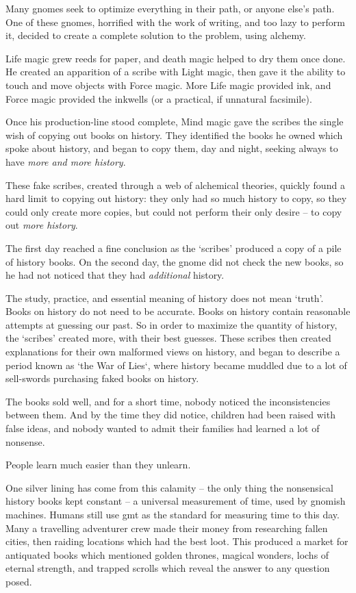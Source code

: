 \begin{multicols}{2}
\begin{exampletext}
  Many gnomes seek to optimize everything in their path, or anyone else's path.
  One of these gnomes, horrified with the work of writing, and too lazy to perform it, decided to create a complete solution to the problem, using alchemy.

  Life magic grew reeds for paper, and death magic helped to dry them once done.
  He created an apparition of a scribe with Light magic, then gave it the ability to touch and move objects with Force magic.
  More Life magic provided ink, and Force magic provided the inkwells (or a practical, if unnatural facsimile).

  Once his production-line stood complete, Mind magic gave the scribes the single wish of copying out books on history.
  They identified the books he owned which spoke about history, and began to copy them, day and night, seeking always to have \emph{more and more history}.

  These fake scribes, created through a web of alchemical theories, quickly found a hard limit to copying out history: they only had so much history to copy, so they could only create more copies, but could not perform their only desire -- to copy out \emph{more history}.

  The first day reached a fine conclusion as the `scribes' produced a copy of a pile of history books.
  On the second day, the gnome did not check the new books, so he had not noticed that they had \emph{additional} history.

  The study, practice, and essential meaning of history does not mean `truth'.
  Books on history do not need to be accurate.
  Books on history contain reasonable attempts at guessing our past.
  So in order to maximize the quantity of history, the `scribes' created more, with their best guesses.
  These scribes then created explanations for their own malformed views on history, and began to describe a period known as `the War of Lies`, where history became muddled due to a lot of sell-swords purchasing faked books on history.

  The books sold well, and for a short time, nobody noticed the inconsistencies between them.
  And by the time they did notice, children had been raised with false ideas, and nobody wanted to admit their families had learned a lot of nonsense.

  People learn much easier than they unlearn.

    One silver lining has come from this calamity -- the only thing the nonsensical history books kept constant -- a universal measurement of time, used by gnomish machines.
    Humans still use \gls{gmt} as the standard for measuring time to this day.
  \else
    Many a travelling adventurer crew made their money from researching fallen cities, then raiding locations which had the best loot.
    This produced a market for antiquated books which mentioned golden thrones, magical wonders, lochs of eternal strength, and trapped scrolls which reveal the answer to any question posed.


\end{exampletext}
\end{multicols}
